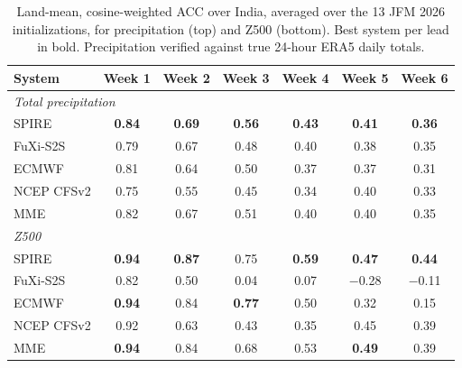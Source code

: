 \documentclass[11pt,a4paper]{article}
\begin{document}
\begin{table}[t]
  \centering
  \small
  \caption{Land-mean, cosine-weighted ACC over India, averaged over the
  13 JFM 2026 initializations, for precipitation (top) and Z500 (bottom).
  Best system per lead in bold. Precipitation verified against true
  24-hour ERA5 daily totals.}
  \label{tab:acc}
  \setlength{\tabcolsep}{5pt}
  \begin{tabular}{lcccccc}
    \toprule
    System & Week 1 & Week 2 & Week 3 & Week 4 & Week 5 & Week 6 \\
    \midrule
    \multicolumn{7}{l}{\emph{Total precipitation}}\\
    SPIRE        & \textbf{0.84} & \textbf{0.69} & \textbf{0.56} & \textbf{0.43} & \textbf{0.41} & \textbf{0.36} \\
    FuXi-S2S     & 0.79 & 0.67 & 0.48 & 0.40 & 0.38 & 0.35 \\
    ECMWF        & 0.81 & 0.64 & 0.50 & 0.37 & 0.37 & 0.31 \\
    NCEP CFSv2   & 0.75 & 0.55 & 0.45 & 0.34 & 0.40 & 0.33 \\
    MME          & 0.82 & 0.67 & 0.51 & 0.40 & 0.40 & 0.35 \\
    \midrule
    \multicolumn{7}{l}{\emph{Z500}}\\
    SPIRE        & \textbf{0.94} & \textbf{0.87} & 0.75          & \textbf{0.59} & \textbf{0.47} & \textbf{0.44} \\
    FuXi-S2S     & 0.82 & 0.50 & 0.04          & 0.07          & $-$0.28       & $-$0.11 \\
    ECMWF        & \textbf{0.94} & 0.84 & \textbf{0.77} & 0.50 & 0.32          & 0.15 \\
    NCEP CFSv2   & 0.92 & 0.63 & 0.43          & 0.35          & 0.45          & 0.39 \\
    MME          & \textbf{0.94} & 0.84 & 0.68 & 0.53 & \textbf{0.49} & 0.39 \\
    \bottomrule
  \end{tabular}
\end{table}
\end{document}
